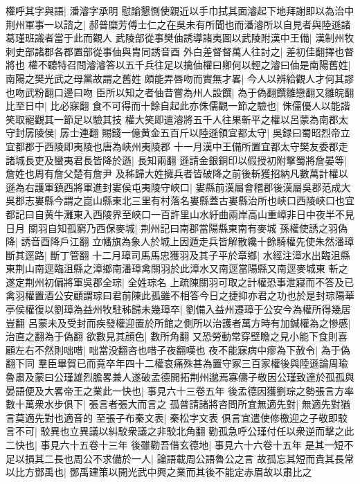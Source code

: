 權呼其字與語|{
	潘濬字承明}
慰諭懇惻使親近以手巾拭其面濬起下地拜謝即以為治中荆州軍事一以諮之|{
	郝普糜芳傅士仁之在吳未有所聞也而潘濬所以自見者與陸遜諸葛瑾班識者當于此而觀人}
武陵部從事樊伷誘導諸夷圖以武陵附漢中王備|{
	漢制州牧刺史部諸郡各郡置部從事伷與胄同誘音酉}
外白差督督萬人往討之|{
	差初佳翻擇也督將也}
權不聽特召問濬濬答以五千兵往足以擒伷權曰卿何以輕之濬曰伷是南陽舊姓|{
	南陽之樊光武之母黨故謂之舊姓}
頗能弄唇吻而實無才畧|{
	今人以辨給觀人才何其謬也吻武粉翻口邊曰吻}
臣所以知之者伷昔嘗為州人設饌|{
	為于偽翻饌雛戀翻又雛皖翻}
比至日中|{
	比必寐翻}
食不可得而十餘自起此亦侏儒觀一節之驗也|{
	侏儒優人以能諧笑取寵觀其一節足以驗其技}
權大笑即遣濬將五千人往果斬平之權以呂蒙為南郡太守封孱陵侯|{
	孱士連翻}
賜錢一億黄金五百斤以陸遜領宜都太守|{
	吳録曰蜀昭烈帝立宜都郡于西陵即夷陵也唐為峽州夷陵郡}
十一月漢中王備所置宜都太守樊友委郡走諸城長吏及蠻夷君長皆降於遜|{
	長知兩翻}
遜請金銀銅印以假授初附擊蜀將詹晏等|{
	詹姓也周有詹父楚有詹尹}
及秭歸大姓擁兵者皆破降之前後斬獲招納凡數萬計權以遜為右護軍鎮西將軍進封婁侯屯夷陵守峽口|{
	婁縣前漢屬會稽郡後漢屬吳郡范成大吳郡志婁縣今謂之崑山縣東北三里有村落名婁縣蓋古婁縣治所也峽口西陵峽口也宜都記曰自黄牛灘東入西陵界至峽口一百許里山水紆曲兩岸高山重嶂非日中夜半不見日月}
關羽自知孤窮乃西保麥城|{
	荆州記曰南郡當陽縣東南有麥城}
孫權使誘之羽偽降|{
	誘音酉降戶江翻}
立幡旗為象人於城上因遁走兵皆解散纔十餘騎權先使朱然潘璋斷其逕路|{
	斷丁管翻}
十二月璋司馬馬忠獲羽及其子平於章鄉|{
	水經注漳水出臨沮縣東荆山南逕臨沮縣之漳鄉南潘璋禽關羽於此漳水又南逕當陽縣又南逕麥城東}
斬之遂定荆州初偏將軍吳郡全琮|{
	全姓琮名}
上疏陳關羽可取之計權恐事泄寢而不答及已禽羽權置酒公安顧謂琮曰君前陳此孤雖不相答今日之捷抑亦君之功也於是封琮陽華亭侯權復以劉璋為益州牧駐秭歸未幾璋卒|{
	劉備入益州遷璋于公安今為權所得幾居豈翻}
呂蒙未及受封而疾發權迎置於所館之側所以治護者萬方時有加鍼權為之慘慼|{
	治直之翻為于偽翻}
欲數見其顔色|{
	數所角翻}
又恐勞動常穿壁瞻之見小能下食則喜顧左右不然則咄唶|{
	咄當没翻咨也唶子夜翻嘆也}
夜不能寐病中瘳為下赦令|{
	為于偽翻下同}
羣臣畢賀已而竟卒年四十二權哀痛殊甚為置守冢三百家權後與陸遜論周瑜魯肅及蒙曰公瑾雄烈膽畧兼人遂破孟德開拓荆州邈焉寡儔子敬因公瑾致達於孤孤與晏語便及大畧帝王之業此一快也|{
	事見六十三卷五年}
後孟德因獲劉琮之勢張言方率數十萬衆水步俱下|{
	張言者張大而言之}
孤普請諸將咨問所宜無適先對|{
	無適先對猶言莫適先對也適音的}
至張子布秦文表|{
	秦松字文表}
俱言宜遣使修檄迎之子敬即駮言不可|{
	駮異也立異議以糾駮衆議之非駮北角翻}
勸孤急呼公瑾付任以衆逆而擊之此二快也|{
	事見六十五卷十三年}
後雖勸吾借玄德地|{
	事見六十六卷十五年}
是其一短不足以損其二長也周公不求備於一人|{
	論語載周公語魯公之言}
故孤忘其短而貴其長常以比方鄧禹也|{
	鄧禹建策以開光武中興之業而其後不能定赤眉故以肅比之}
